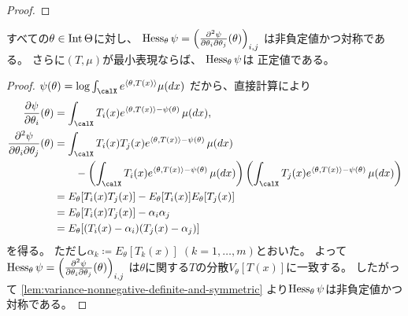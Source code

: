 \documentclass[report]{jlreq}
\begin{document}
\begin{proof}
    \TODO{}
\end{proof}

\begin{theorem}
    すべての$\theta \in \operatorname{Int}\Theta$に対し、
    $\operatorname{Hess}_{\theta} \psi
        = \left({
            \frac{\partial^2 \psi}{\partial\theta_i \partial\theta_j} (\theta)
        }\right)_{i, j}$
    は非負定値かつ対称である。
    さらに$(T, \mu)$が最小表現ならば、
    $\operatorname{Hess}_\theta \psi$は
    正定値である。
\end{theorem}

\begin{proof}
    $\psi(\theta) = \log \int_\calX e^{\langle \theta, T(x) \rangle} \mu(dx)$
    だから、直接計算により
    \begin{alignat}{1}
        \deldel[\psi]{\theta_i}(\theta)
            &= \int_\calX
                T_i(x)
                e^{\langle \theta, T(x) \rangle - \psi(\theta)}
                \, \mu(dx), \\
        \frac{\del^2 \psi}{\del\theta_i \del\theta_j} (\theta)
            &= \int_\calX
                T_i(x) T_j(x)
                e^{\langle \theta, T(x) \rangle - \psi(\theta)}
                \, \mu(dx) \nonumber \\
            &\qquad - \myparen{
                \int_\calX
                    T_i(x)
                    e^{\langle \theta, T(x) \rangle - \psi(\theta)}
                    \, \mu(dx)
            }
            \myparen{
                \int_\calX
                    T_j(x)
                    e^{\langle \theta, T(x) \rangle - \psi(\theta)}
                    \, \mu(dx)
            } \\
            &= E_\theta[T_i(x) T_j(x)] - E_\theta[T_i(x)] E_\theta[T_j(x)] \\
            &= E_\theta[T_i(x) T_j(x)] - \alpha_i \alpha_j \\
            &= E_\theta[(T_i(x) - \alpha_i)(T_j(x) - \alpha_j)]
    \end{alignat}
    を得る。
    ただし$\alpha_k \coloneqq E_\theta[T_k(x)] \; (k = 1, \dots, m)$とおいた。
    よって
    $\operatorname{Hess}_\theta \psi
        = \left({
            \frac{\partial^2 \psi}{\partial\theta_i \partial\theta_j} (\theta)
        }\right)_{i, j}$
    は$\theta$に関する$T$の分散$V_\theta[T(x)]$に一致する。
    したがって
    \cref{lem:variance-nonnegative-definite-and-symmetric}
    より$\operatorname{Hess}_\theta \psi$は非負定値かつ対称である。
    \TODO{}
\end{proof}
\end{document}
